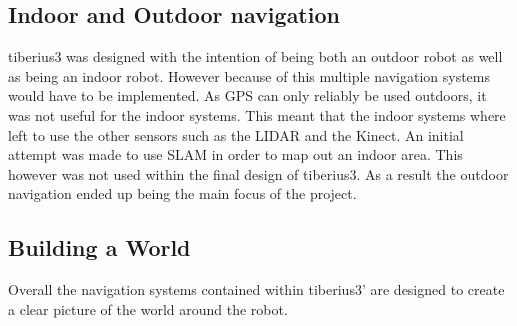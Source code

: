 \subsection{Indoor and Outdoor navigation}
\gls{tiberius3} was designed with the intention of being both an outdoor robot as well as being an indoor robot. However because of this multiple navigation systems would have to be implemented. As \gls{GPS} can only reliably be used outdoors, it was not useful for the indoor systems. This meant that the indoor systems where left to use the other sensors such as the \gls{LIDAR} and the Kinect. An initial attempt was made to use \gls{SLAM} in order to map out an indoor area. This however was not used within the final design of \gls{tiberius3}. As a result the outdoor navigation ended up being the main focus of the project.
\subsection{Building a World}
Overall the navigation systems contained within \gls{tiberius3}' are designed to create a clear picture of the world around the robot.